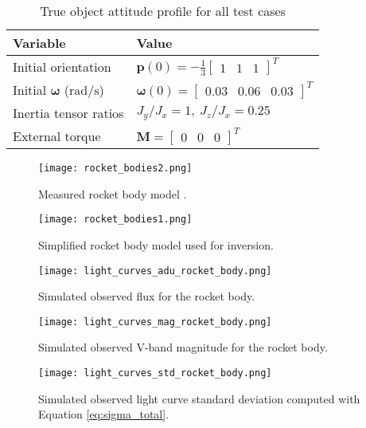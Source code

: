 \documentclass[a4paper,twocolumn]{spaceDebrisC} %
\newcommand{\vctr}[1]{\bm{#1}}
\newcommand{\figsmall}[0]{0.3\textwidth}
\begin{document}
\begin{table}[ht]
  \centering
  \caption{True object attitude profile for all test cases}
  \vspace*{6pt}
  \begin{tabular}{|l|l|}
  \hline
  \textbf{Variable} & \textbf{Value} \\ \hline
 Initial orientation & $\vctr{p}(0) = -\frac{1}{3} \begin{bmatrix} 1 & 1 & 1 \end{bmatrix}^T$ \\ \hline
 Initial $\vctr{\omega}$ ($\text{rad}/\text{s}$) & $\vctr{\omega}(0) = \begin{bmatrix} 0.03 & 0.06 & 0.03 \end{bmatrix}^T$ \\ \hline
 Inertia tensor ratios & $J_y / J_x = 1, \: J_z / J_x = 0.25$ \\ \hline
 External torque & $\vctr{M}=\begin{bmatrix} 0 & 0 & 0 \end{bmatrix}^T$ \\ \hline
  \end{tabular}
  \label{tb:synth_truth}
\end{table}

\begin{figure}[ht]
  \centering
  \texttt{[image: rocket\_bodies2.png]}
  \caption{Measured rocket body model \cite{nasa_models}.}
  \label{fig:meas_model}
\end{figure}

\begin{figure}[ht]
  \centering
  \texttt{[image: rocket\_bodies1.png]}
  \caption{Simplified rocket body model used for inversion.}
  \label{fig:inv_model}
\end{figure}

\begin{figure}[ht]
  \centering
  \texttt{[image: light\_curves\_adu\_rocket\_body.png]}
  \caption{Simulated observed flux for the rocket body.}
  \label{fig:obs_adu_synth}
\end{figure}

\begin{figure}[ht]
  \centering
  \texttt{[image: light\_curves\_mag\_rocket\_body.png]}
  \caption{Simulated observed V-band magnitude for the rocket body.}
  \label{fig:obs_mag_synth}
\end{figure}

\begin{figure}[ht]
  \centering
  \texttt{[image: light\_curves\_std\_rocket\_body.png]}
  \caption{Simulated observed light curve standard deviation computed with Equation \ref{eq:sigma_total}.}
  \label{fig:obs_std_synth}
\end{figure}
\end{document}
